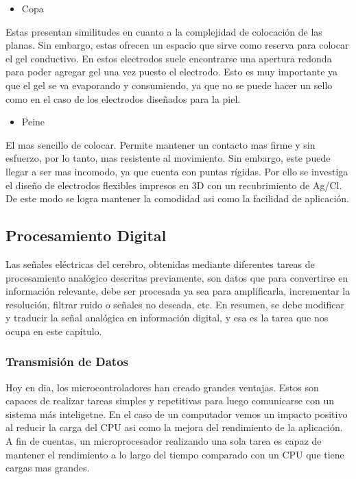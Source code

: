 \begin{itemize}
\item Copa
\end{itemize}
Estas presentan similitudes en cuanto a la complejidad de colocación de las planas. Sin embargo, estas ofrecen un espacio que sirve como reserva para colocar el gel conductivo. En estos electrodos suele encontrarse una apertura redonda para poder agregar gel una vez puesto el electrodo. Esto es muy importante ya que el gel se va evaporando y consumiendo, ya que no se puede hacer un sello como en el caso de los electrodos diseñados para la piel.

\begin{itemize}
\item Peine
\end{itemize}
El mas sencillo de colocar. Permite mantener un contacto mas firme y sin esfuerzo, por lo tanto, mas resistente al movimiento. Sin embargo, este puede llegar a ser mas incomodo, ya que cuenta con puntas rígidas. Por ello se investiga el diseño de electrodos flexibles impresos en 3D con un recubrimiento de Ag/Cl. De este modo se logra mantener la comodidad asi como la facilidad de aplicación.

\subsection{Procesamiento Digital}
\label{sec:org8d64a17}
Las señales eléctricas del cerebro, obtenidas mediante diferentes tareas de procesamiento analógico descritas previamente, son datos que para convertirse en información relevante, debe ser procesada ya sea para amplificarla, incrementar la resolución, filtrar ruido o señales no deseada, etc. En resumen, se debe modificar y traducir la señal analógica en información digital, y esa es la tarea que nos ocupa en este capítulo.

\subsubsection{Transmisión de Datos}
\label{sec:orgee40064}
Hoy en dia, los microcontroladores han creado grandes ventajas. Estos son capaces de realizar tareas simples y repetitivas para luego comunicarse con un sistema más inteligetne. En el caso de un computador vemos un impacto positivo al reducir la carga del CPU asi como la mejora del rendimiento de la aplicación. A fin de cuentas, un microprocesador realizando una sola tarea es capaz de mantener el rendimiento a lo largo del tiempo comparado con un CPU que tiene cargas mas grandes.

